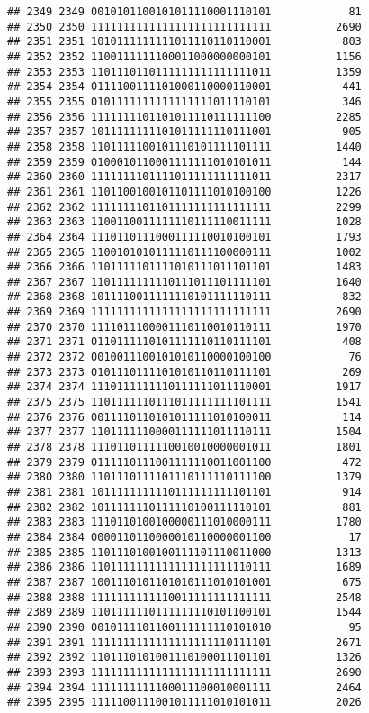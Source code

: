 \documentclass[]{article}
\begin{document}
\begin{verbatim}
## 2349 2349 0010101100101011110001110101            81
## 2350 2350 1111111111111111111111111111          2690
## 2351 2351 1010111111111011110110110001           803
## 2352 2352 1100111111100011000000000101          1156
## 2353 2353 1101110110111111111111111011          1359
## 2354 2354 0111100111101000110000110001           441
## 2355 2355 0101111111111111111011110101           346
## 2356 2356 1111111101101011110111111100          2285
## 2357 2357 1011111111101011111110111001           905
## 2358 2358 1101111100101110101111101111          1440
## 2359 2359 0100010110001111111010101011           144
## 2360 2360 1111111101111011111111111011          2317
## 2361 2361 1101100100101101111010100100          1226
## 2362 2362 1111111101101111111111111111          2299
## 2363 2363 1100110011111110111110011111          1028
## 2364 2364 1110110111000111110010100101          1793
## 2365 2365 1100101010111110111100000111          1002
## 2366 2366 1101111101111010111011101101          1483
## 2367 2367 1101111111110111011101111101          1640
## 2368 2368 1011110011111110101111110111           832
## 2369 2369 1111111111111111111111111111          2690
## 2370 2370 1111011100001110110010110111          1970
## 2371 2371 0110111110101111110110111101           408
## 2372 2372 0010011100101010110000100100            76
## 2373 2373 0101110111101010110110111101           269
## 2374 2374 1110111111110111111011110001          1917
## 2375 2375 1101111110111011111111101111          1541
## 2376 2376 0011110110101011111010100011           114
## 2377 2377 1101111110000111111011110111          1504
## 2378 2378 1110110111110010010000001011          1801
## 2379 2379 0111110111001111110011001100           472
## 2380 2380 1101110111101110111110111100          1379
## 2381 2381 1011111111110111111111101101           914
## 2382 2382 1011111110111110100111110101           881
## 2383 2383 1110110100100000111010000111          1780
## 2384 2384 0000110110000010110000001100            17
## 2385 2385 1101110100100111101110011000          1313
## 2386 2386 1101111111111111111111110111          1689
## 2387 2387 1001110101101010111010101001           675
## 2388 2388 1111111111110011111111111111          2548
## 2389 2389 1101111110111111110101100101          1544
## 2390 2390 0010111101100111111110101010            95
## 2391 2391 1111111111111111111110111101          2671
## 2392 2392 1101110101001110100011101101          1326
## 2393 2393 1111111111111111111111111111          2690
## 2394 2394 1111111111100011100010001111          2464
## 2395 2395 1111100111001011111010101011          2026

\end{verbatim}
\end{document}
